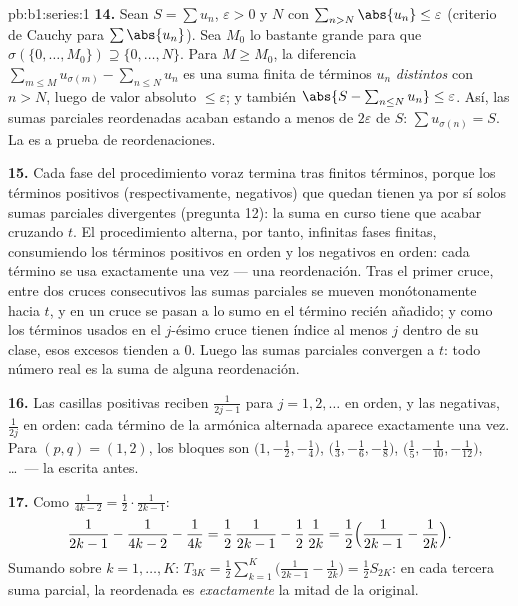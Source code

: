 \begin{solution}{pb:b1:series:1}
\textbf{14.} Sean $S = \sum u_n$, $\varepsilon > 0$ y $N$ con
$\sum_{n > N} \abs{u_n} \leq \varepsilon$ (criterio de Cauchy para
$\sum\abs{u_n}$). Sea $M_0$ lo bastante grande para que
$\sigma(\{0, \dots, M_0\}) \supseteq \{0, \dots, N\}$. Para
$M \geq M_0$, la diferencia
$\sum_{m \leq M} u_{\sigma(m)} - \sum_{n \leq N} u_n$ es una suma
finita de términos $u_n$ \emph{distintos} con $n > N$, luego de valor
absoluto $\leq \varepsilon$; y también
$\abs{S - \sum_{n\leq N} u_n} \leq \varepsilon$. Así, las sumas
parciales reordenadas acaban estando a menos de $2\varepsilon$ de
$S$: $\sum u_{\sigma(n)} = S$. La  es a prueba
de reordenaciones.

\textbf{15.} Cada fase del procedimiento voraz termina tras finitos
términos, porque los términos positivos (respectivamente, negativos)
que quedan tienen ya por sí solos sumas parciales divergentes
(pregunta 12): la suma en curso tiene que acabar cruzando $t$. El
procedimiento alterna, por tanto, infinitas fases finitas,
consumiendo los términos positivos en orden y los negativos en orden:
cada término se usa exactamente una vez --- una reordenación. Tras el
primer cruce, entre dos cruces consecutivos las sumas parciales se
mueven monótonamente hacia $t$, y en un cruce se pasan a lo sumo en
el término recién añadido; y como los términos usados en el
$j$-ésimo cruce tienen índice al menos $j$ dentro de su clase, esos
excesos tienden a $0$. Luego las sumas parciales convergen a $t$:
todo número real es la suma de alguna reordenación.

\textbf{16.} Las casillas positivas reciben $\frac{1}{2j-1}$ para
$j = 1, 2, \dots$ en orden, y las negativas, $\frac{1}{2j}$ en
orden: cada término de la  armónica alternada aparece
exactamente una vez. Para $(p, q) = (1, 2)$, los bloques son
$\bigl(1, -\frac12, -\frac14\bigr)$, $\bigl(\frac13, -\frac16,
-\frac18\bigr)$, $\bigl(\frac15, -\frac1{10},
-\frac1{12}\bigr)$, \dots\ --- la  escrita antes.

\textbf{17.} Como $\frac{1}{4k-2} = \frac12\cdot\frac{1}{2k-1}$:
\[
\frac{1}{2k-1} - \frac{1}{4k-2} - \frac{1}{4k}
= \frac12\,\frac{1}{2k-1} - \frac12\,\frac{1}{2k}
= \frac12\Bigl(\frac{1}{2k-1} - \frac{1}{2k}\Bigr).
\]
Sumando sobre $k = 1, \dots, K$:
$T_{3K} = \frac12 \sum_{k=1}^{K}\bigl(\frac{1}{2k-1} -
\frac{1}{2k}\bigr) = \frac12 S_{2K}$: en cada tercera suma parcial,
la  reordenada es \emph{exactamente} la mitad de la original.


\end{solution}
